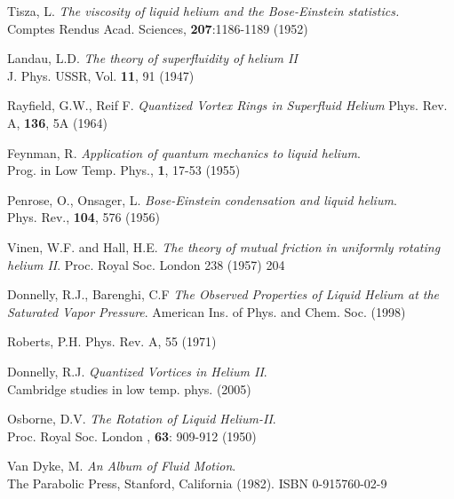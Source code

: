 
\def\bibname{Bibliography}
\begin{thebibliography}{99}
	\addcontentsline{toc}{chapter}{\bibname}

	{\sc Tisza, L.}
	\emph{The viscosity of liquid helium and the Bose-Einstein statistics.}\\
	Comptes Rendus Acad. Sciences, \textbf{207}:1186-1189 (1952)

	{\sc Landau, L.D.}
	\emph{The theory of superfluidity of helium II}\\
	J. Phys. USSR, Vol. \textbf{11}, 91 (1947)

	{\sc Rayfield, G.W., Reif F.}
	\emph{Quantized Vortex Rings in Superfluid Helium} Phys. Rev. A, \textbf{136}, 5A (1964)

	{\sc Feynman, R.}
	\emph{Application of quantum mechanics to liquid helium}.\\
	Prog. in Low Temp. Phys., \textbf{1}, 17-53 (1955)

	{\sc Penrose, O., Onsager, L.}
	\emph{Bose-Einstein condensation and liquid helium}.\\
	Phys. Rev., \textbf{104}, 576 (1956)

	{\sc Vinen, W.F.} and {\sc Hall, H.E.}
	\emph{The theory of mutual friction in uniformly rotating helium II}.
	Proc. Royal Soc. London 238 (1957) 204

	{\sc Donnelly, R.J., Barenghi, C.F}
	\emph{The Observed Properties of Liquid Helium at the Saturated Vapor Pressure}. American Ins. of Phys. and Chem. Soc. (1998)

	{\sc Roberts, P.H.}
	\emph{} Phys. Rev. A, 55 (1971)

	{\sc Donnelly, R.J.}
	\emph{Quantized Vortices in Helium II}.\\
	Cambridge studies in low temp. phys. (2005)

	{\sc Osborne, D.V.}
	\emph{The Rotation of Liquid Helium-II}.\\
	Proc. Royal Soc. London , \textbf{63}: 909-912 (1950)

	{\sc Van Dyke, M.}
	\emph{An Album of Fluid Motion}.\\
	The Parabolic Press, Stanford, California (1982). ISBN 0-915760-02-9


\end{thebibliography}
